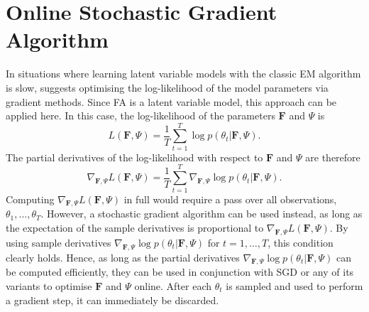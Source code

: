 \documentclass[msc,deptreport.inf]{infthesis} %
\newcommand{\matr}[1]{\mathbf{#1}}
\begin{document}
\section{Online Stochastic Gradient Algorithm}\label{sec:gradient_fa}

In situations where learning latent variable models with the classic EM algorithm is slow, \cite{barber2007} suggests optimising the log-likelihood of the model parameters via gradient methods. Since FA is a latent variable model, this approach can be applied here. In this case, the log-likelihood of the parameters $\matr{F}$ and $\Psi$ is 
\begin{equation}
	L(\matr{F}, \Psi) = \frac{1}{T} \sum_{t=1}^T \log p(\theta_t | \matr{F}, \Psi).
\end{equation}
The partial derivatives of the log-likelihood with respect to $\matr{F}$ and $\Psi$ are therefore
\begin{equation}
	\nabla_{\matr{F}, \Psi} L(\matr{F}, \Psi) = \frac{1}{T} \sum_{t=1}^T \nabla_{\matr{F}, \Psi} \log p(\theta_t | \matr{F}, \Psi).
\end{equation}
Computing $\nabla_{\matr{F}, \Psi} L(\matr{F}, \Psi)$ in full would require a pass over all observations, $\theta_1, \dots, \theta_T$. However, a stochastic gradient algorithm can be used instead, as long as the expectation of the sample derivatives is proportional to $\nabla_{\matr{F}, \Psi} L(\matr{F}, \Psi)$. By using sample derivatives $\nabla_{\matr{F}, \Psi} \log p(\theta_t | \matr{F}, \Psi)$ for $t=1,\dots,T$, this condition clearly holds. Hence, as long as the partial derivatives $\nabla_{\matr{F}, \Psi} \log p(\theta_t | \matr{F}, \Psi)$ can be computed efficiently, they can be used in conjunction with SGD or any of its variants to optimise $\matr{F}$ and $\Psi$ online. After each $\theta_t$ is sampled and used to perform a gradient step, it can immediately be discarded. 
\end{document}
